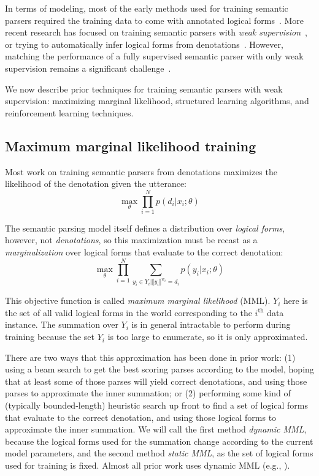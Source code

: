 In terms of modeling, most of the early methods used for training semantic
parsers required the training data to come with annotated logical
forms~\citep{zelle1996learning,Zettlemoyer2005LearningTM}. More recent research has
focused on training semantic parsers with \emph{weak 
supervision}~\citep{liang2011learning,berant2013semantic}, or trying to automatically infer
logical forms from denotations~\citep{pasupat2016inferring}. However, matching
the performance of a fully supervised semantic parser with only weak
supervision remains a significant challenge~\citep{Yih2016TheVO}.

We now describe prior techniques for training semantic parsers with
weak supervision: maximizing marginal likelihood, structured learning
algorithms, and reinforcement learning techniques.

\subsection{Maximum marginal likelihood training}\label{sec:mml}
Most work on training semantic parsers from denotations maximizes the
likelihood of the denotation given the utterance:
\begin{equation}
	\max_\theta \prod_{i=1}^N p(d_i|x_i; \theta)
\end{equation}

\noindent The semantic parsing model itself defines a distribution over
\emph{logical forms}, however, not \emph{denotations}, so this maximization
must be recast as a \emph{marginalization} over logical forms that evaluate to
the correct denotation:
\begin{equation}
	\max_\theta \prod_{i=1}^N
	\sum_{y_i \in Y_i | \llbracket y_i \rrbracket^{w_i} = d_i} p(y_i | x_i; \theta)
	\label{eq:mml_objective}
\end{equation}

\noindent This objective function is called \emph{maximum marginal likelihood}
(MML).  $Y_i$ here is the set of all valid logical forms in the world
corresponding to the $i^\text{th}$ data instance. The summation over $Y_i$ is in
general intractable to perform during training because the set $Y_i$ is too
large to enumerate, so it is only approximated.

There are two ways that this approximation has been done in prior work: (1)
using a beam search to get the best scoring parses according to the model,
hoping that at least some of those parses will yield correct denotations, and
using those parses to approximate the inner summation; or (2) performing some
kind of (typically bounded-length) heuristic search up front to find a set of
logical forms that evaluate to the correct denotation, and using those logical
forms to approximate the inner summation.  We will call the first method
\emph{dynamic MML}, because the logical forms used for the summation change
according to the current model parameters, and the second method \emph{static
MML}, as the set of logical forms used for training is fixed.  Almost all prior
work uses dynamic MML (e.g.,
\citet{liang2011learning,berant2013semantic,goldman2017weakly}).

